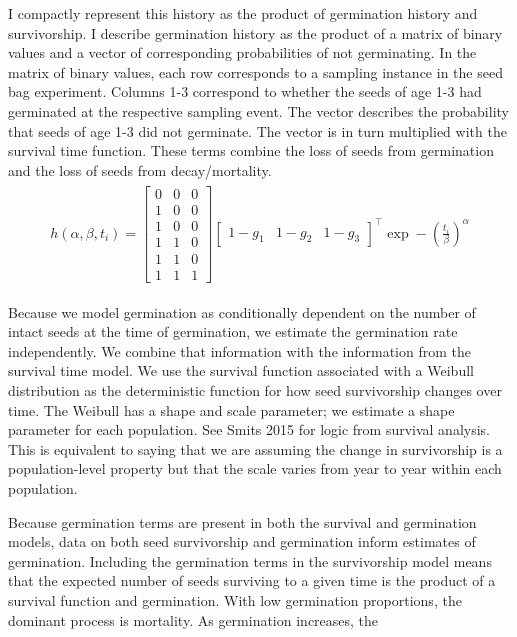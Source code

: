 \documentclass[12pt, oneside, titlepage]{article}   	%
\begin{document}
I compactly represent this history as the product of germination history and survivorship. I describe germination history as the product of a matrix of binary values and a vector of corresponding probabilities of not germinating. In the matrix of binary values, each row corresponds to a sampling instance in the seed bag experiment. Columns 1-3 correspond to whether the seeds of age 1-3 had germinated at the respective sampling event. The vector describes the probability that seeds of age 1-3 did not germinate. The vector is in turn multiplied with the survival time function. These terms combine the loss of seeds from germination and the loss of seeds from decay/mortality.
%
\begin{align}
  \begin{split}
  h(\alpha,\beta,t_i) = 
\begin{bmatrix}
0 & 0 & 0\\
1 & 0 & 0\\
1 & 0 & 0\\
1 & 1 & 0\\
1 & 1 & 0\\
1 & 1 & 1
\end{bmatrix}
\begin{bmatrix}
1-g_1 & 1-g_2 & 1-g_3
\end{bmatrix}^\top
\exp-(\frac{t_i}{\beta})^\alpha
  \end{split}
\end{align}

Because we model germination as conditionally dependent on the number of intact seeds at the time of germination, we estimate the germination rate independently. We combine that information with the information from the survival time model. We use the survival function associated with a Weibull distribution as the deterministic function for how seed survivorship changes over time. The Weibull has a shape and scale parameter; we estimate a shape parameter for each population. See Smits 2015 for logic from survival analysis.  This is equivalent to saying that we are assuming the change in survivorship is a population-level property but that the scale varies from year to year within each population. 

Because germination terms are present in both the survival and germination models, data on both seed survivorship and germination inform estimates of germination. Including the germination terms in the survivorship model means that the expected number of seeds surviving to a given time is the product of a survival function and germination. With low germination proportions, the dominant process is mortality. As germination increases, the 
\end{document}
